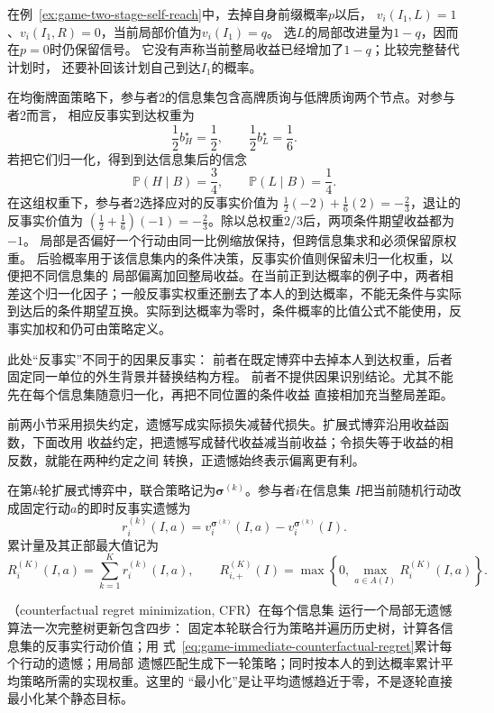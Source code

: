 在例~\ref{ex:game-two-stage-self-reach}中，去掉自身前缀概率$p$以后，
$v_i(I_1,L)=1$、$v_i(I_1,R)=0$，当前局部价值为$v_i(I_1)=q$。
选$L$的局部改进量为$1-q$，因而在$p=0$时仍保留信号。
它没有声称当前整局收益已经增加了$1-q$；比较完整替代计划时，
还要补回该计划自己到达$I_1$的概率。

在均衡牌面策略下，参与者2的信息集包含高牌质询与低牌质询两个节点。对参与者2而言，
相应反事实到达权重为
\[
  \frac12 b_H^\star=\frac12,
  \qquad
  \frac12 b_L^\star=\frac16.
\]
若把它们归一化，得到到达信息集后的信念
\[
  \mathbb{P}(H\mid B)=\frac34,\qquad
  \mathbb{P}(L\mid B)=\frac14.
\]
在这组权重下，参与者2选择应对的反事实价值为
$\frac12(-2)+\frac16(2)=-\frac23$，退让的反事实价值为
$(\frac12+\frac16)(-1)=-\frac23$。除以总权重$2/3$后，两项条件期望收益都为$-1$。
局部是否偏好一个行动由同一比例缩放保持，但跨信息集求和必须保留原权重。
后验概率用于该信息集内的条件决策，反事实价值则保留未归一化权重，以便把不同信息集的
局部偏离加回整局收益。在当前正到达概率的例子中，两者相差这个归一化因子；一般反事实权重还删去了本人的到达概率，不能无条件与实际到达后的条件期望互换。实际到达概率为零时，条件概率的比值公式不能使用，反事实加权和仍可由策略定义。

此处“反事实”不同于的因果反事实：
前者在既定博弈中去掉本人到达权重，后者固定同一单位的外生背景并替换结构方程。
前者不提供因果识别结论。尤其不能先在每个信息集随意归一化，再把不同位置的条件收益
直接相加充当整局差距。

前两小节采用损失约定，遗憾写成实际损失减替代损失。扩展式博弈沿用收益函数，下面改用
收益约定，把遗憾写成替代收益减当前收益；令损失等于收益的相反数，就能在两种约定之间
转换，正遗憾始终表示偏离更有利。

在第\(k\)轮扩展式博弈中，联合策略记为\(\bm{\sigma}^{(k)}\)。参与者\(i\)在信息集
\(I\)把当前随机行动改成固定行动\(a\)的即时反事实遗憾为
\begin{equation}
  r_i^{(k)}(I,a)
  =
  v_i^{\bm{\sigma}^{(k)}}(I,a)
  -
  v_i^{\bm{\sigma}^{(k)}}(I).
  \label{eq:game-immediate-counterfactual-regret}
\end{equation}
累计量及其正部最大值记为
\[
  R_i^{(K)}(I,a)
  =
  \sum_{k=1}^{K}r_i^{(k)}(I,a),
  \qquad
  R_{i,+}^{(K)}(I)
  =
  \max\left\{0,\max_{a\in A(I)}R_i^{(K)}(I,a)\right\}.
\]

（counterfactual regret minimization, CFR）在每个信息集
运行一个局部无遗憾算法一次完整树更新包含四步：
固定本轮联合行为策略并遍历历史树，计算各信息集的反事实行动价值；用
式~\eqref{eq:game-immediate-counterfactual-regret}累计每个行动的遗憾；用局部
遗憾匹配生成下一轮策略；同时按本人的到达概率累计平均策略所需的实现权重。这里的
“最小化”是让平均遗憾趋近于零，不是逐轮直接最小化某个静态目标。


